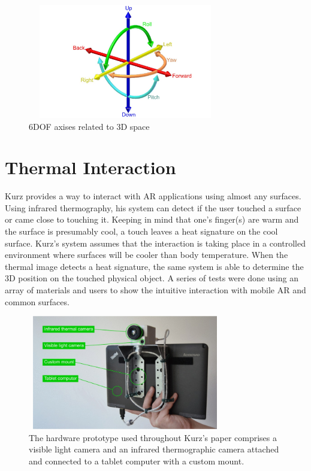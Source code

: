 \documentclass{sig-alternate}
\begin{document}
\begin{figure}
	\includegraphics[width=8.5cm, height=5cm]{6DOF_en}
	\caption{6DOF axises related to 3D space \cite{6DOF}}
	\label{fig:6DOF}
\end{figure}  


\section{Thermal Interaction}
\label{sec:Thermal Interaction}
Kurz \cite{Thermal} provides a way to interact with AR applications using almost any surfaces. Using infrared thermography, his system can detect if the user touched a surface or came close to touching it. Keeping in mind that one's finger(s) are warm and the surface is presumably cool, a touch leaves a heat signature on the cool surface. Kurz's system assumes that the interaction is taking place in a controlled environment where surfaces will be cooler than body temperature. When the thermal image detects a heat signature, the same system is able to determine the 3D position on the touched physical object. A series of tests were done using an array of materials and users to show the intuitive interaction with mobile AR and common surfaces. 

\begin{figure}
	\includegraphics[width=8.5cm, height=5cm]{Hardware2}
	\caption{The hardware prototype used throughout Kurz's paper comprises a visible light camera and an infrared thermographic camera attached and connected to a tablet computer with a custom mount. \cite{Thermal}}
	\label{fig:hardware}
\end{figure}
\end{document}
